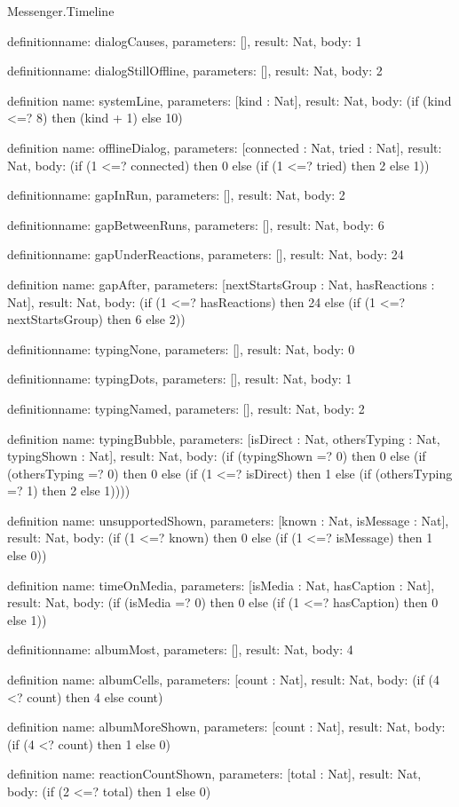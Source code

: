 \begin{lexlean}{Messenger.Timeline}
\begin{semanticmodule}
definition{name: dialogCauses, parameters: [], result: Nat, body: 1}

definition{name: dialogStillOffline, parameters: [], result: Nat, body: 2}

definition{
  name: systemLine,
  parameters: [kind : Nat],
  result: Nat,
  body: (if (kind <=? 8) then (kind + 1) else 10)
}

definition{
  name: offlineDialog,
  parameters: [connected : Nat, tried : Nat],
  result: Nat,
  body: (if (1 <=? connected) then 0 else (if (1 <=? tried) then 2 else 1))
}

definition{name: gapInRun, parameters: [], result: Nat, body: 2}

definition{name: gapBetweenRuns, parameters: [], result: Nat, body: 6}

definition{name: gapUnderReactions, parameters: [], result: Nat, body: 24}

definition{
  name: gapAfter,
  parameters: [nextStartsGroup : Nat, hasReactions : Nat],
  result: Nat,
  body: (if (1 <=? hasReactions) then 24 else (if (1 <=? nextStartsGroup) then 6 else 2))
}

definition{name: typingNone, parameters: [], result: Nat, body: 0}

definition{name: typingDots, parameters: [], result: Nat, body: 1}

definition{name: typingNamed, parameters: [], result: Nat, body: 2}

definition{
  name: typingBubble,
  parameters: [isDirect : Nat, othersTyping : Nat, typingShown : Nat],
  result: Nat,
  body: (if (typingShown =? 0) then 0 else (if (othersTyping =? 0) then 0 else (if (1 <=? isDirect) then 1 else (if (othersTyping =? 1) then 2 else 1))))
}

definition{
  name: unsupportedShown,
  parameters: [known : Nat, isMessage : Nat],
  result: Nat,
  body: (if (1 <=? known) then 0 else (if (1 <=? isMessage) then 1 else 0))
}

definition{
  name: timeOnMedia,
  parameters: [isMedia : Nat, hasCaption : Nat],
  result: Nat,
  body: (if (isMedia =? 0) then 0 else (if (1 <=? hasCaption) then 0 else 1))
}

definition{name: albumMost, parameters: [], result: Nat, body: 4}

definition{
  name: albumCells,
  parameters: [count : Nat],
  result: Nat,
  body: (if (4 <? count) then 4 else count)
}

definition{
  name: albumMoreShown,
  parameters: [count : Nat],
  result: Nat,
  body: (if (4 <? count) then 1 else 0)
}

definition{
  name: reactionCountShown,
  parameters: [total : Nat],
  result: Nat,
  body: (if (2 <=? total) then 1 else 0)
}
\end{semanticmodule}
\end{lexlean}
